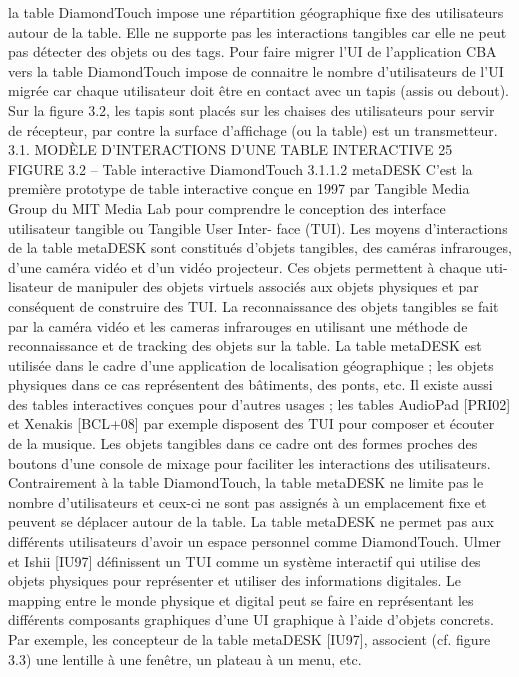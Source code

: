 \documentclass{article}
\begin{document}
la table DiamondTouch impose une répartition géographique ﬁxe des utilisateurs autour de la table.
Elle ne supporte pas les interactions tangibles car elle ne peut pas détecter des objets ou des tags.
Pour faire migrer l’UI de l’application CBA vers la table DiamondTouch impose de connaitre le
nombre d’utilisateurs de l’UI migrée car chaque utilisateur doit être en contact avec un tapis (assis ou
debout). Sur la ﬁgure 3.2, les tapis sont placés sur les chaises des utilisateurs pour servir de récepteur,
par contre la surface d’afﬁchage (ou la table) est un transmetteur.
3.1. MODÈLE D’INTERACTIONS D’UNE TABLE INTERACTIVE
25
FIGURE 3.2 – Table interactive DiamondTouch
3.1.1.2
metaDESK
C’est la première prototype de table interactive conçue en 1997 par Tangible Media Group du MIT
Media Lab pour comprendre le conception des interface utilisateur tangible ou Tangible User Inter-
face (TUI). Les moyens d’interactions de la table metaDESK sont constitués d’objets tangibles, des
caméras infrarouges, d’une caméra vidéo et d’un vidéo projecteur. Ces objets permettent à chaque uti-
lisateur de manipuler des objets virtuels associés aux objets physiques et par conséquent de construire
des TUI. La reconnaissance des objets tangibles se fait par la caméra vidéo et les cameras infrarouges
en utilisant une méthode de reconnaissance et de tracking des objets sur la table. La table metaDESK
est utilisée dans le cadre d’une application de localisation géographique ; les objets physiques dans
ce cas représentent des bâtiments, des ponts, etc. Il existe aussi des tables interactives conçues pour
d’autres usages ; les tables AudioPad [PRI02] et Xenakis [BCL+08] par exemple disposent des TUI
pour composer et écouter de la musique. Les objets tangibles dans ce cadre ont des formes proches
des boutons d’une console de mixage pour faciliter les interactions des utilisateurs.
Contrairement à la table DiamondTouch, la table metaDESK ne limite pas le nombre d’utilisateurs
et ceux-ci ne sont pas assignés à un emplacement ﬁxe et peuvent se déplacer autour de la table.
La table metaDESK ne permet pas aux différents utilisateurs d’avoir un espace personnel comme
DiamondTouch.
Ulmer et Ishii
[IU97] déﬁnissent un TUI comme un système interactif qui utilise des objets
physiques pour représenter et utiliser des informations digitales. Le mapping entre le monde physique
et digital peut se faire en représentant les différents composants graphiques d’une UI graphique à
l’aide d’objets concrets. Par exemple, les concepteur de la table metaDESK [IU97], associent (cf.
ﬁgure 3.3) une lentille à une fenêtre, un plateau à un menu, etc.
\end{document}
